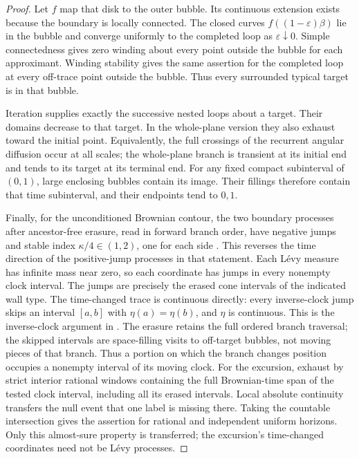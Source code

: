 \documentclass[11pt]{article}
\numberwithin{equation}{section}
\theoremstyle{definition}
\theoremstyle{remark}
\newcommand{\1}{\mathbf 1}
\begin{document}
\begin{proof}
Let $f$ map that disk to the outer bubble.  Its continuous extension
exists because the boundary is locally connected.  The closed curves
$f((1-\varepsilon)\beta)$ lie in the bubble and converge uniformly to
the completed loop as $\varepsilon\downarrow0$.  Simple connectedness
gives zero winding about every point outside the bubble for each
approximant.  Winding stability gives the same assertion for the
completed loop at every off-trace point outside the bubble.  Thus every
surrounded typical target is in that bubble.

Iteration supplies exactly the successive nested loops about a target.
Their domains decrease to that target.  In the whole-plane version they
also exhaust toward the initial point.  Equivalently, the full crossings
of the recurrent angular diffusion occur at all scales; the whole-plane
branch is transient at its initial end and tends to its target at its
terminal end.  For any fixed compact subinterval of $(0,1)$, large
enclosing bubbles contain its image.  Their fillings therefore contain
that time subinterval, and their endpoints tend to $0,1$.

Finally, for the unconditioned Brownian contour, the two boundary
processes after ancestor-free erasure, read in forward branch order,
have negative jumps and stable index
$\kappa/4\in(1,2)$, one for each side
\cite[Proposition~1.13]{DMSMating}.  This reverses the time direction
of the positive-jump processes in that statement.  Each L\'evy measure has
infinite mass near zero, so each coordinate has jumps in every nonempty
clock interval.  The jumps are precisely the erased cone intervals of
the indicated wall type.  The time-changed trace is continuous directly:
every inverse-clock jump skips an interval $[a,b]$ with
$\eta(a)=\eta(b)$, and $\eta$ is continuous.  This is the inverse-clock
argument in \cite[Proposition~10.6]{DMSMating}.
The erasure retains the full ordered branch traversal; the skipped
intervals are space-filling visits to off-target bubbles, not moving
pieces of that branch.  Thus a portion on which the branch changes
position occupies a nonempty interval of its moving clock.
For the excursion, exhaust by strict interior rational windows
containing the full Brownian-time span of the tested clock interval,
including all its erased intervals.  Local absolute continuity
transfers the null event that one label is missing there.  Taking the
countable intersection gives the assertion for rational and independent
uniform horizons.  Only this almost-sure property is transferred;
the excursion's time-changed coordinates need not be L\'evy processes.
\end{proof}
\end{document}
